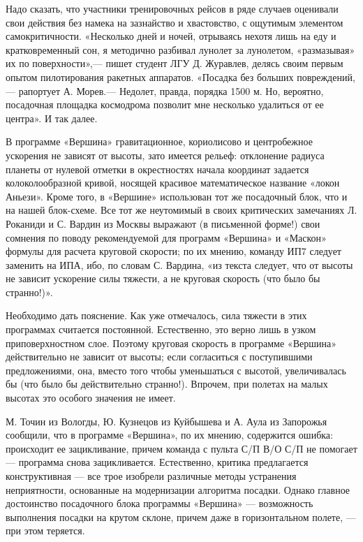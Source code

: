 \documentclass[11pt,a4paper,oneside]{article}
\begin{document}
Надо сказать, что участники тренировочных рейсов в ряде случаев оценивали свои действия без намека на зазнайство и хвастовство, с ощутимым элементом самокритичности. «Несколько дней и ночей, отрываясь нехотя лишь на еду и кратковременный сон, я методично разбивал лунолет за лунолетом, «размазывая» их по поверхности»,— пишет студент ЛГУ Д. Журавлев, делясь своим первым опытом пилотирования ракетных аппаратов. «Посадка без больших повреждений,— рапортует А. Морев.— Недолет, правда, порядка 1500 м. Но, вероятно, посадочная площадка космодрома позволит мне несколько удалиться от ее центра». И так далее.

В программе «Вершина» гравитационное, кориолисово и центробежное ускорения не зависят от высоты, зато имеется рельеф: отклонение радиуса планеты от нулевой отметки в окрестностях начала координат задается колоколообразной кривой, носящей красивое математическое название «локон Аньези». Кроме того, в «Вершине» использован тот же посадочный блок, что и на нашей блок-схеме. Все тот же неутомимый в своих критических замечаниях Л. Роканиди и С. Вардин из Москвы выражают (в письменной форме!) свои сомнения по поводу рекомендуемой для программ «Вершина» и «Маскон» формулы для расчета круговой скорости; по их мнению, команду ИП7 следует заменить на ИПА, ибо, по словам С. Вардина, «из текста следует, что от высоты не зависит ускорение силы тяжести, а не круговая скорость (что было бы странно!)».

Необходимо дать пояснение. Как уже отмечалось, сила тяжести в этих программах считается постоянной. Естественно, это верно лишь в узком приповерхностном слое. Поэтому круговая скорость в программе «Вершина» действительно не зависит от высоты; если согласиться с поступившими предложениями, она, вместо того чтобы уменьшаться с высотой, увеличивалась бы (что было бы действительно странно!). Впрочем, при полетах на малых высотах это особого значения не имеет.

М. Точин из Вологды, Ю. Кузнецов из Куйбышева и А. Аула из Запорожья сообщили, что в программе «Вершина», по их мнению, содержится ошибка: происходит ее зацикливание, причем команда с пульта С/П В/О С/П не помогает — программа снова зацикливается. Естественно, критика предлагается конструктивная — все трое изобрели различные методы устранения неприятности, основанные на модернизации алгоритма посадки. Однако главное достоинство посадочного блока программы «Вершина» — возможность выполнения посадки на крутом склоне, причем даже в горизонтальном полете, — при этом теряется.
\end{document}

